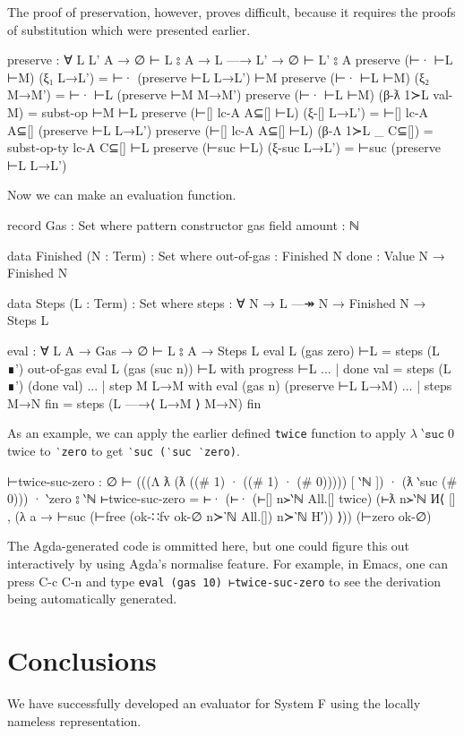 \documentclass[logo,bsc,singlespacing,parskip,online]{infthesis}
\begin{document}
The proof of preservation, however, proves difficult, because it requires the proofs of substitution
which were presented earlier.
\begin{code}
  preserve : ∀ {L L' A} → ∅ ⊢ L ⦂ A → L —→ L' → ∅ ⊢ L' ⦂ A
  preserve (⊢· ⊢L ⊢M) (ξ₁ L→L') = ⊢· (preserve ⊢L L→L') ⊢M
  preserve (⊢· ⊢L ⊢M) (ξ₂ M→M') = ⊢· ⊢L (preserve ⊢M M→M')
  preserve (⊢· ⊢L ⊢M) (β-ƛ 1≻L val-M) = subst-op ⊢M ⊢L
  preserve (⊢[] lc-A A⊆[] ⊢L) (ξ-[] L→L') =
    ⊢[] lc-A A⊆[] (preserve ⊢L L→L')
  preserve (⊢[] lc-A A⊆[] ⊢L) (β-Λ 1≻L _ C⊆[]) =
    subst-op-ty lc-A C⊆[] ⊢L
  preserve (⊢suc ⊢L) (ξ-suc L→L') = ⊢suc (preserve ⊢L L→L')
\end{code}

Now we can make an evaluation function.
\begin{code}
  record Gas : Set where
    pattern
    constructor gas
    field
      amount : ℕ

  data Finished (N : Term) : Set where
    out-of-gas : Finished N
    done : Value N → Finished N

  data Steps (L : Term) : Set where
    steps : ∀ {N} → L —↠ N → Finished N → Steps L

  eval : ∀ {L A} → Gas → ∅ ⊢ L ⦂ A → Steps L
  eval {L} (gas zero) ⊢L = steps (L ∎') out-of-gas
  eval {L} (gas (suc n)) ⊢L with progress ⊢L
  ... | done val = steps (L ∎') (done val)
  ... | step {M} L→M with eval (gas n) (preserve ⊢L L→M)
  ...   | steps M→N fin = steps (L —→⟨ L→M ⟩ M→N) fin
\end{code}

As an example, we can apply the earlier defined \texttt{twice} function to apply $\lambda \;
\texttt{‵suc} \; 0$ twice to \texttt{‵zero} to get \texttt{‵suc (‵suc ‵zero)}.
\begin{code}
  ⊢twice-suc-zero :
    ∅ ⊢ (((Λ ƛ (ƛ ((# 1) · ((# 1) · (# 0))))) [ ‵ℕ ])
          · (ƛ ‵suc (# 0))) · ‵zero
        ⦂ ‵ℕ
  ⊢twice-suc-zero = ⊢·
    (⊢· (⊢[] n≻‵ℕ All.[] twice)
      (⊢ƛ n≻‵ℕ И⟨ [] , (λ a →
        ⊢suc (⊢free (ok-∷fv ok-∅ n≻‵ℕ All.[]) n≻‵ℕ H′)) ⟩))
    (⊢zero ok-∅)
\end{code}

The Agda-generated code is ommitted here, but one could figure this out interactively by using
Agda's normalise feature. For example, in Emacs, one can press C-c C-n and type \texttt{eval (gas 10) ⊢twice-suc-zero} to see the derivation being automatically generated.

\chapter{Conclusions}
We have successfully developed an evaluator for System F using the locally nameless representation.
\end{document}
